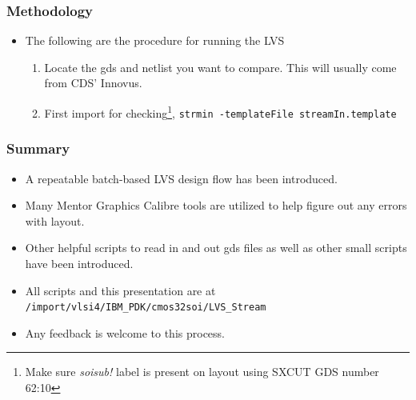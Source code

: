 \documentclass{beamer}
\begin{document}
\begin{frame}[fragile]
\frametitle{Methodology}
\begin{itemize}
\item The following are the procedure for running the LVS
\begin{enumerate}
\item Locate the gds and netlist you want to compare.  This will
  usually come from CDS' Innovus.
\item First import for checking\footnote{Make sure \textit{soisub!}
  label is present on layout using SXCUT GDS number 62:10},
  \verb+strmin -templateFile streamIn.template+

\end{enumerate}
\end{itemize}
\end{frame}
\begin{frame}[fragile]
\frametitle{Summary}
\begin{itemize}
\item A repeatable batch-based LVS design flow has been introduced.
\item Many Mentor Graphics Calibre tools are utilized to help figure
  out any errors with layout.
\item Other helpful scripts to read in and out gds files as well as
  other small scripts have been introduced.
\item All scripts and this presentation are 
  at \verb+/import/vlsi4/IBM_PDK/cmos32soi/LVS_Stream+
\item Any feedback is welcome to this process.
\end{itemize}
\end{frame}
\end{document}
